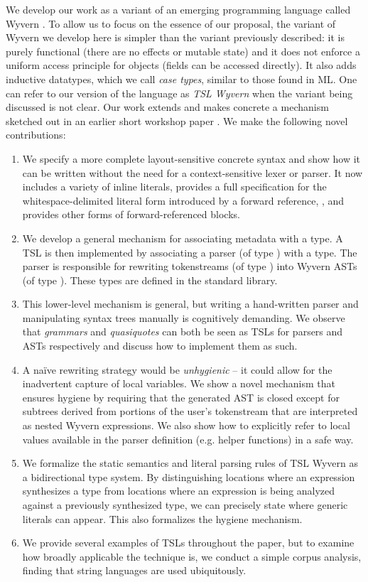 We develop our work as a variant of an emerging programming language called Wyvern \cite{Nistor:2013:WST:2489828.2489830}. To allow us to focus on the essence of our proposal, the variant of Wyvern we develop here is simpler than the variant previously described: it is purely functional (there are no effects or mutable state) and it does not enforce a uniform access principle for objects (fields can be accessed directly). It also adds inductive datatypes, which we call \emph{case types}, similar to those found in ML. One can refer to our version of the language as \emph{TSL Wyvern} when the variant being discussed is not clear. Our work extends and makes concrete a mechanism sketched out in an earlier short workshop paper \cite{Omar:2013:TWP:2489812.2489815}. We make the following novel contributions:
\begin{enumerate}
\item We specify a more complete layout-sensitive concrete syntax and show how it can be written without the need for a context-sensitive lexer or parser. It now includes a variety of inline literals, provides a full specification for the whitespace-delimited literal form introduced by a forward reference, \li{~}, and provides other forms of forward-referenced blocks.
\item We develop a general mechanism for associating metadata with a type. A TSL is then implemented by associating a parser (of type ) with a type. The parser is responsible for rewriting tokenstreams (of type ) into Wyvern ASTs (of type ). These types are defined in the standard library.
\item This lower-level mechanism is general, but writing a hand-written parser and manipulating syntax trees manually is cognitively demanding. We observe that \emph{grammars} and \emph{quasiquotes} can both be seen as TSLs for parsers and ASTs respectively and discuss how to implement them as such.
\item A na\"ive rewriting strategy would be \emph{unhygienic} -- it could allow for the inadvertent capture of local variables. We show a novel mechanism that ensures hygiene by requiring that the generated AST is closed except for subtrees derived from portions of the user's tokenstream that are interpreted as nested Wyvern expressions. We also show how to explicitly refer to local values available in the parser definition (e.g. helper functions) in a safe way. 
\item We formalize the static semantics and literal parsing rules of TSL Wyvern as a bidirectional type system. By distinguishing locations where an expression synthesizes a type from locations where an expression is being analyzed against a previously synthesized type, we can precisely state where generic literals can appear. This also formalizes the hygiene mechanism.
\item We provide several examples of TSLs throughout the paper, but to examine how broadly applicable the technique is, we conduct a simple corpus analysis, finding that string languages are used ubiquitously.
\end{enumerate}
